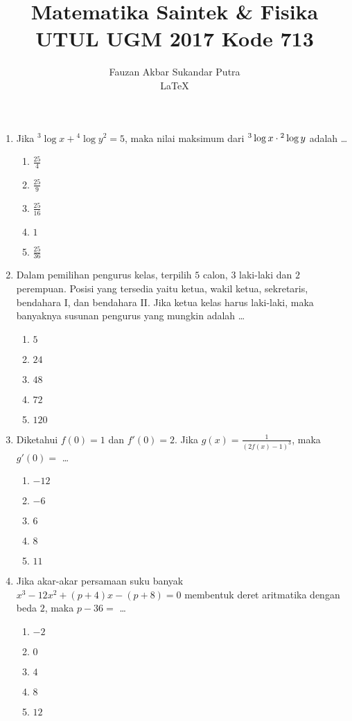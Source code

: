 \documentclass[A4,12PT, english, twocolumn]{journal}
\title{Matematika Saintek \& Fisika UTUL UGM 2017 Kode 713}
\author{Fauzan Akbar Sukandar Putra \\ \LaTeX}
\begin{document}
\maketitle

\begin{enumerate}

\item Jika ${}^3 \log x + {}^4 \log y^2 = 5$, maka nilai maksimum dari ${}^3 \Log x \cdot {}^2 \Log y$ adalah \dots
    \begin{enumerate}
        \item $\frac{25}{4}$
        \item $\frac{25}{9}$
        \item $\frac{25}{16}$
        \item $1$
        \item $\frac{25}{36}$
    \end{enumerate}

\item Dalam pemilihan pengurus kelas, terpilih $5$ calon, $3$ laki-laki dan $2$ perempuan. Posisi yang tersedia yaitu ketua, wakil ketua, sekretaris, bendahara I, dan bendahara II. Jika ketua kelas harus laki-laki, maka banyaknya susunan pengurus yang mungkin adalah \dots
    \begin{enumerate}
        \item $5$
        \item $24$
        \item $48$
        \item $72$
        \item $120$
    \end{enumerate}

\item Diketahui $f(0)=1$ dan $f'(0)=2$. Jika $g(x)= \frac{1}{\left(2f(x)-1 \right)^3}$, maka $g'(0)=$ \dots
    \begin{enumerate}
        \item $-12$
        \item $-6$
        \item $6$
        \item $8$
        \item $11$
    \end{enumerate}

\item Jika akar-akar persamaan suku banyak $x^3-12x^2+(p+4)x-(p+8)=0$ membentuk deret aritmatika dengan beda $2$, maka $p-36=$ \dots
    \begin{enumerate}
        \item $-2$
        \item $0$
        \item $4$
        \item $8$
        \item $12$
    \end{enumerate}


\end{enumerate}
\end{document}

